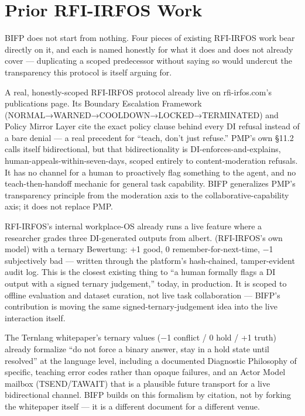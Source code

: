 \documentclass[11pt,a4paper]{article}
\begin{document}
\section{Prior RFI-IRFOS Work}
BIFP does not start from nothing. Four pieces of existing RFI-IRFOS work bear directly on it, and each is named honestly for what it does and does not already cover — duplicating a scoped predecessor without saying so would undercut the transparency this protocol is itself arguing for.


\begin{tcolorbox}[findingbox, title={Policy Mirror Protocol (PMP), OSF, 2025-08-21}]
A real, honestly-scoped RFI-IRFOS protocol already live on rfi-irfos.com's publications page. Its Boundary Escalation Framework (NORMAL→WARNED→COOLDOWN→LOCKED→TERMINATED) and Policy Mirror Layer cite the exact policy clause behind every DI refusal instead of a bare denial — a real precedent for “teach, don't just refuse.” PMP's own §11.2 calls itself bidirectional, but that bidirectionality is DI-enforces-and-explains, human-appeals-within-seven-days, scoped entirely to content-moderation refusals. It has no channel for a human to proactively flag something to the agent, and no teach-then-handoff mechanic for general task capability. BIFP generalizes PMP's transparency principle from the moderation axis to the collaborative-capability axis; it does not replace PMP.
\end{tcolorbox}
\vspace{4pt}

\begin{tcolorbox}[findingbox, title={lighthouse/backend/src/rlhf.rs — real, shipped code}]
RFI-IRFOS's internal workplace-OS already runs a live feature where a researcher grades three DI-generated outputs from albert. (RFI-IRFOS's own model) with a ternary Bewertung: +1 good, 0 remember-for-next-time, −1 subjectively bad — written through the platform's hash-chained, tamper-evident audit log. This is the closest existing thing to “a human formally flags a DI output with a signed ternary judgement,” today, in production. It is scoped to offline evaluation and dataset curation, not live task collaboration — BIFP's contribution is moving the same signed-ternary-judgement idea into the live interaction itself.
\end{tcolorbox}
\vspace{4pt}

The Ternlang whitepaper's ternary values (−1 conflict / 0 hold / +1 truth) already formalize “do not force a binary answer, stay in a hold state until resolved” at the language level, including a documented Diagnostic Philosophy of specific, teaching error codes rather than opaque failures, and an Actor Model mailbox (TSEND/TAWAIT) that is a plausible future transport for a live bidirectional channel. BIFP builds on this formalism by citation, not by forking the whitepaper itself — it is a different document for a different venue.
\end{document}

